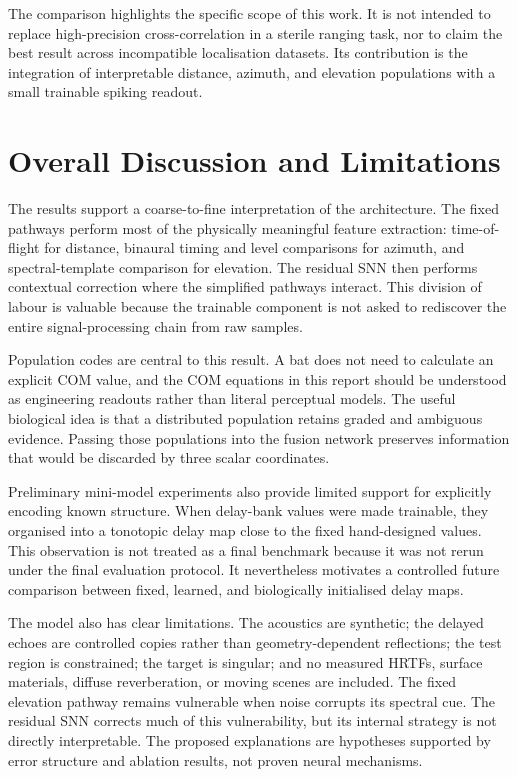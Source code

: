The comparison highlights the specific scope of this work. It is not intended to replace high-precision cross-correlation in a sterile ranging task, nor to claim the best result across incompatible localisation datasets. Its contribution is the integration of interpretable distance, azimuth, and elevation populations with a small trainable spiking readout.

\section{Overall Discussion and Limitations}

The results support a coarse-to-fine interpretation of the architecture. The fixed pathways perform most of the physically meaningful feature extraction: time-of-flight for distance, binaural timing and level comparisons for azimuth, and spectral-template comparison for elevation. The residual SNN then performs contextual correction where the simplified pathways interact. This division of labour is valuable because the trainable component is not asked to rediscover the entire signal-processing chain from raw samples.

Population codes are central to this result. A bat does not need to calculate an explicit COM value, and the COM equations in this report should be understood as engineering readouts rather than literal perceptual models. The useful biological idea is that a distributed population retains graded and ambiguous evidence. Passing those populations into the fusion network preserves information that would be discarded by three scalar coordinates.

Preliminary mini-model experiments also provide limited support for explicitly encoding known structure. When delay-bank values were made trainable, they organised into a tonotopic delay map close to the fixed hand-designed values. This observation is not treated as a final benchmark because it was not rerun under the final evaluation protocol. It nevertheless motivates a controlled future comparison between fixed, learned, and biologically initialised delay maps.

The model also has clear limitations. The acoustics are synthetic; the delayed echoes are controlled copies rather than geometry-dependent reflections; the test region is constrained; the target is singular; and no measured HRTFs, surface materials, diffuse reverberation, or moving scenes are included. The fixed elevation pathway remains vulnerable when noise corrupts its spectral cue. The residual SNN corrects much of this vulnerability, but its internal strategy is not directly interpretable. The proposed explanations are hypotheses supported by error structure and ablation results, not proven neural mechanisms.


